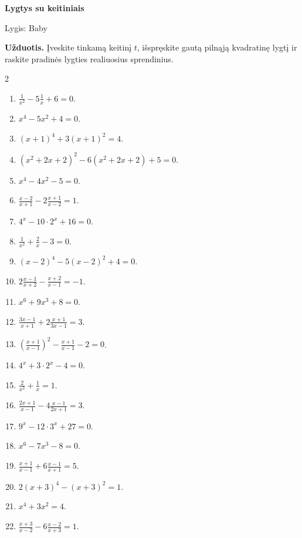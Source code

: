\documentclass[11pt,a4paper]{article}
\begin{document}
\begin{center}
{\Large\bfseries Lygtys su keitiniais}

\medskip
{\large Lygis: Baby}

\end{center}
\textbf{Užduotis.} Įveskite tinkamą keitinį \(t\), išspręskite gautą
pilnąją kvadratinę lygtį ir raskite pradinės lygties realiuosius sprendinius.
\medskip
\begin{multicols}{2}
\begin{enumerate}
\item \(\displaystyle \frac1{x^2}-5\frac1x+6=0\).
\item \(\displaystyle x^4-5x^2+4=0\).
\item \(\displaystyle \left(x+1\right)^4+3\left(x+1\right)^2=4\).
\item \(\displaystyle \left(x^2+2x+2\right)^2-6\left(x^2+2x+2\right)+5=0\).
\item \(\displaystyle x^4-4x^2-5=0\).
\item \(\displaystyle \frac{x-2}{x+1}-2\frac{x+1}{x-2}=1\).
\item \(\displaystyle 4^x-10\cdot 2^x+16=0\).
\item \(\displaystyle \frac1{x^2}+\frac{2}{x}-3=0\).
\item \(\displaystyle \left(x-2\right)^4-5\left(x-2\right)^2+4=0\).
\item \(\displaystyle 2\frac{x-1}{x+2}-\frac{x+2}{x-1}=-1\).
\item \(\displaystyle x^6+9x^3+8=0\).
\item \(\displaystyle \frac{3x-1}{x+1}+2\frac{x+1}{3x-1}=3\).
\item \(\displaystyle \left(\frac{x+1}{x-1}\right)^2-\frac{x+1}{x-1}-2=0\).
\item \(\displaystyle 4^x+3\cdot 2^x-4=0\).
\item \(\displaystyle \frac{2}{x^2}+\frac1x=1\).
\item \(\displaystyle \frac{2x+1}{x-1}-4\frac{x-1}{2x+1}=3\).
\item \(\displaystyle 9^x-12\cdot 3^x+27=0\).
\item \(\displaystyle x^6-7x^3-8=0\).
\item \(\displaystyle \frac{x+1}{x-1}+6\frac{x-1}{x+1}=5\).
\item \(\displaystyle 2\left(x+3\right)^4-\left(x+3\right)^2=1\).
\item \(\displaystyle x^4+3x^2=4\).
\item \(\displaystyle \frac{x+3}{x-2}-6\frac{x-2}{x+3}=1\).

\end{enumerate}
\end{multicols}
\end{document}
